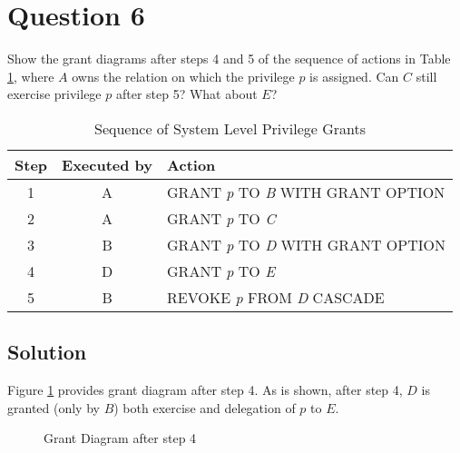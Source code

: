 
\section*{Question 6}

Show the grant diagrams after steps 4 and 5 of the sequence of actions in Table \ref{table51}, where $A$ owns the relation on which the privilege $p$ is assigned. Can $C$ still exercise privilege $p$ after step 5? What about $E$?

\begin{table}[H]
\centering
\begin{tabular}{|c|c|l|}
\hline
Step & Executed by & Action\\
\hline \hline
1 & A & GRANT \textit{p} TO \textit{B} WITH GRANT OPTION\\
2 & A & GRANT \textit{p} TO \textit{C} \\
3 & B & GRANT \textit{p} TO \textit{D} WITH GRANT OPTION\\
4 & D & GRANT \textit{p} TO \textit{E} \\
5 & B & REVOKE \textit{p} FROM \textit{D} CASCADE\\
\hline
\end{tabular}
\caption{Sequence of System Level Privilege Grants}\label{table51}
\end{table}

\subsection*{Solution}

Figure \ref{fig1} provides grant diagram after step 4. As is shown, after step 4, $D$ is granted (only by $B$) both exercise and delegation of $\textit{p}$ to $E$.

\begin{figure}[H]\centering
{}
\caption{Grant Diagram after step 4}\label{fig1}
\end{figure}

